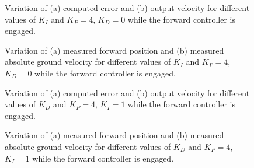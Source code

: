 \begin{figure}[H]
    \begin{minipage}[t]{0.5\linewidth}
        \centering
        \scalebox{0.55}{}
    \end{minipage}
    \begin{minipage}[t]{0.5\linewidth}
        \centering
        \scalebox{0.55}{}
    \end{minipage}
    \caption{Variation of (a) computed error and (b) output velocity for different values of $K_{I}$ and $K_P=4$, $K_D=0$ while the forward controller is engaged.}
    \label{fig:tune-fwd-int-io}
\end{figure}
\begin{figure}[H]
    \begin{minipage}[t]{0.5\linewidth}
        \centering
        \scalebox{0.55}{}
    \end{minipage}
    \begin{minipage}[t]{0.5\linewidth}
        \centering
        \scalebox{0.55}{}
    \end{minipage}
    \caption{Variation of (a) measured forward position and (b) measured absolute ground velocity for different values of $K_{I}$ and $K_P=4$, $K_D=0$ while the forward controller is engaged.}
    \label{fig:tune-fwd-int-measures}
\end{figure}

\begin{figure}[H]
    \begin{minipage}[t]{0.5\linewidth}
        \centering
        \scalebox{0.55}{}
    \end{minipage}
    \begin{minipage}[t]{0.5\linewidth}
        \centering
        \scalebox{0.55}{}
    \end{minipage}
    \caption{Variation of (a) computed error and (b) output velocity for different values of $K_{D}$ and $K_P=4$, $K_I=1$ while the forward controller is engaged.}
    \label{fig:tune-fwd-der-io}
\end{figure}
\begin{figure}[H]
    \begin{minipage}[t]{0.5\linewidth}
        \centering
        \scalebox{0.55}{}
    \end{minipage}
    \begin{minipage}[t]{0.5\linewidth}
        \centering
        \scalebox{0.55}{}
    \end{minipage}
    \caption{Variation of (a) measured forward position and (b) measured absolute ground velocity for different values of $K_{D}$ and $K_P=4$, $K_I=1$ while the forward controller is engaged.}
    \label{fig:tune-fwd-der-measures}
\end{figure}